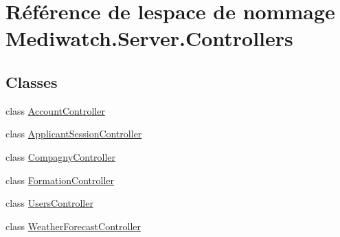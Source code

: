 \hypertarget{namespace_mediwatch_1_1_server_1_1_controllers}{}\section{Référence de l\textquotesingle{}espace de nommage Mediwatch.\+Server.\+Controllers}
\label{namespace_mediwatch_1_1_server_1_1_controllers}
\subsection*{Classes}
\begin{DoxyCompactItemize}
\item 
class \hyperlink{class_mediwatch_1_1_server_1_1_controllers_1_1_account_controller}{Account\+Controller}
\item 
class \hyperlink{class_mediwatch_1_1_server_1_1_controllers_1_1_applicant_session_controller}{Applicant\+Session\+Controller}
\item 
class \hyperlink{class_mediwatch_1_1_server_1_1_controllers_1_1_compagny_controller}{Compagny\+Controller}
\item 
class \hyperlink{class_mediwatch_1_1_server_1_1_controllers_1_1_formation_controller}{Formation\+Controller}
\item 
class \hyperlink{class_mediwatch_1_1_server_1_1_controllers_1_1_users_controller}{Users\+Controller}
\item 
class \hyperlink{class_mediwatch_1_1_server_1_1_controllers_1_1_weather_forecast_controller}{Weather\+Forecast\+Controller}
\end{DoxyCompactItemize}
